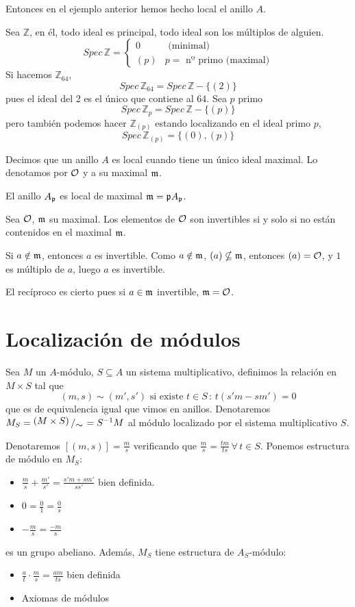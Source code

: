 Entonces en el ejemplo anterior hemos hecho local el anillo $A$. 
\begin{ejem}
    Sea $\mathbb Z$, en \'el, todo ideal es principal, todo ideal son los m\'ultiplos de alguien.
    $$Spec\, \mathbb Z = \left\{ \begin{array}{cc}
         0 &  \text{ (minimal)}\\
         (p) & p = \text{ nº primo (maximal)} 
    \end{array}\right.$$
    Si hacemos $\mathbb Z_{64}$, 
    $$Spec\, \mathbb Z_{64} = Spec \, \mathbb Z - \{(2)\}$$
    pues el ideal del 2 es el \'unico que contiene al 64. Sea $p$ primo
    $$Spec \, \mathbb Z_p = Spec \, \mathbb Z - \{(p)\}$$
    pero tambi\'en podemos hacer $\mathbb Z _{(p)}$ estando localizando en el ideal primo $p$, 
    $$Spec\, \mathbb Z_{(p)} = \{(0), (p)\} $$
\end{ejem}
\begin{defi}
    Decimos que un anillo $A$ es local cuando tiene un \'unico ideal maximal. Lo denotamos por $\mathcal{O}$ y a su maximal $\mathfrak{m}$. 
\end{defi}
\begin{ejem}
    El anillo $A_{\mathfrak{p}}$ es local de maximal $\mathfrak{m} = \mathfrak{p} A_{\mathfrak{p}}$. 
\end{ejem}
Sea $\mathcal{O}$, $\mathfrak{m}$ su maximal. Los elementos de $\mathcal{O}$ son invertibles si y solo si no están contenidos en el maximal $ \mathfrak{m}$. 

Si $a\notin \mathfrak{m}$, entonces $a$ es invertible. Como $a\notin \mathfrak{m}$, $(a)\nsubseteq \mathfrak{m} $, entonces $(a) = \mathcal{O}$, y $1$ es m\'ultiplo de $a$, luego $a$ es invertible. 

El rec\'iproco es cierto pues si $a\in \mathfrak{m}$ invertible, $\mathfrak{m} = \mathcal{O}$. 
\section{Localizaci\'on de m\'odulos}
Sea $M$ un $A$-m\'odulo, $S\subseteq A$ un sistema multiplicativo, definimos la relaci\'on en $M \times S$ tal que 
$$(m,s) \sim (m',s') \text{ si existe } t\in S \, : \, t(s'm-sm')=0$$
que es de equivalencia igual que vimos en anillos. Denotaremos $M_S = \modulo{(M\times S)}{\sim} = S^{-1}M$ al m\'odulo localizado por el sistema multiplicativo $S$. 

Denotaremos $[(m,s)]=\frac{m}{s}$ verificando que $\frac{m}{s}=\frac{tm}{ts} \, \forall\, t \in S$. Ponemos estructura de m\'odulo en $M_S$:
\begin{itemize}
    \item $\displaystyle \frac{m}{s}+\frac{m'}{s'} = \frac{s'm+sm'}{ss'}$ bien definida.
    \item $\displaystyle 0=\frac{0}{1}=\frac{0}{s}$
    \item $\displaystyle -\frac{m}{s}=\frac{-m}{s}$
\end{itemize} es un grupo abeliano. Adem\'as, $M_S$ tiene estructura de $A_S$-m\'odulo:
\begin{itemize}
    \item $\displaystyle \frac{a}{t} \cdot \frac{m}{s} = \frac{am}{ts}$ bien definida
    \item Axiomas de m\'odulos
\end{itemize}

